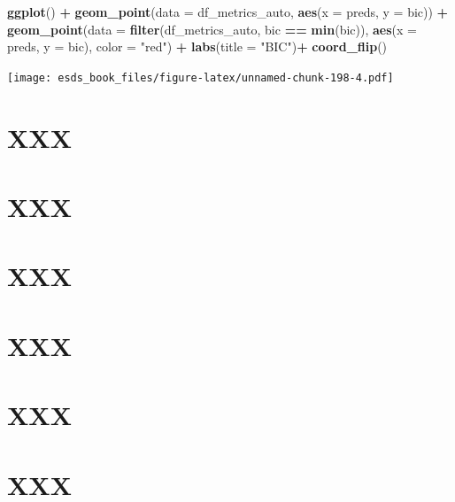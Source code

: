 \documentclass[
]{book}
\newenvironment{Shaded}{\begin{snugshade}}{\end{snugshade}}
\newcommand{\DataTypeTok}[1]{\textcolor[rgb]{0.13,0.29,0.53}{#1}}
\newcommand{\KeywordTok}[1]{\textcolor[rgb]{0.13,0.29,0.53}{\textbf{#1}}}
\newcommand{\NormalTok}[1]{#1}
\newcommand{\OperatorTok}[1]{\textcolor[rgb]{0.81,0.36,0.00}{\textbf{#1}}}
\newcommand{\StringTok}[1]{\textcolor[rgb]{0.31,0.60,0.02}{#1}}
\begin{document}
\begin{Shaded}
\begin{Highlighting}[]
\KeywordTok{ggplot}\NormalTok{() }\OperatorTok{+}
\StringTok{  }\KeywordTok{geom_point}\NormalTok{(}\DataTypeTok{data =}\NormalTok{ df_metrics_auto, }\KeywordTok{aes}\NormalTok{(}\DataTypeTok{x =}\NormalTok{ preds, }\DataTypeTok{y =}\NormalTok{ bic)) }\OperatorTok{+}
\StringTok{  }\KeywordTok{geom_point}\NormalTok{(}\DataTypeTok{data =} \KeywordTok{filter}\NormalTok{(df_metrics_auto, bic }\OperatorTok{==}\StringTok{ }\KeywordTok{min}\NormalTok{(bic)), }\KeywordTok{aes}\NormalTok{(}\DataTypeTok{x =}\NormalTok{ preds, }\DataTypeTok{y =}\NormalTok{ bic), }\DataTypeTok{color =} \StringTok{"red"}\NormalTok{) }\OperatorTok{+}
\StringTok{  }\KeywordTok{labs}\NormalTok{(}\DataTypeTok{title =} \StringTok{"BIC"}\NormalTok{)}\OperatorTok{+}\StringTok{ }
\StringTok{  }\KeywordTok{coord_flip}\NormalTok{()}
\end{Highlighting}
\end{Shaded}

\texttt{[image: esds\_book\_files/figure-latex/unnamed-chunk-198-4.pdf]}

\hypertarget{xxx}{%
\chapter{XXX}\label{xxx}}

\hypertarget{xxx-1}{%
\chapter{XXX}\label{xxx-1}}

\hypertarget{xxx-2}{%
\chapter{XXX}\label{xxx-2}}

\hypertarget{xxx-3}{%
\chapter{XXX}\label{xxx-3}}

\hypertarget{xxx-4}{%
\chapter{XXX}\label{xxx-4}}

\hypertarget{xxx-5}{%
\chapter{XXX}\label{xxx-5}}

  
\end{document}
